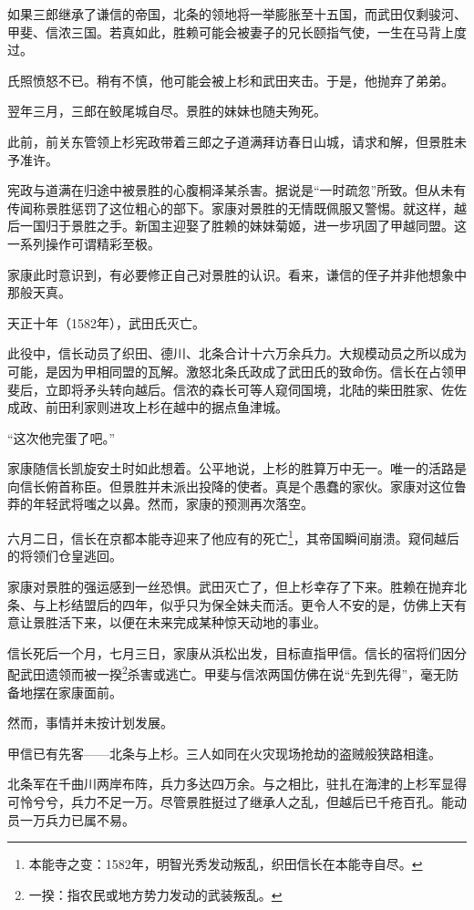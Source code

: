 \documentclass[
]{article}
\begin{document}
如果三郎继承了谦信的帝国，北条的领地将一举膨胀至十五国，而武田仅剩骏河、甲斐、信浓三国。若真如此，胜赖可能会被妻子的兄长颐指气使，一生在马背上度过。

氏照愤怒不已。稍有不慎，他可能会被上杉和武田夹击。于是，他抛弃了弟弟。

翌年三月，三郎在鲛尾城自尽。景胜的妹妹也随夫殉死。

此前，前关东管领上杉宪政带着三郎之子道满拜访春日山城，请求和解，但景胜未予准许。

宪政与道满在归途中被景胜的心腹桐泽某杀害。据说是``一时疏忽''所致。但从未有传闻称景胜惩罚了这位粗心的部下。家康对景胜的无情既佩服又警惕。就这样，越后一国归于景胜之手。新国主迎娶了胜赖的妹妹菊姬，进一步巩固了甲越同盟。这一系列操作可谓精彩至极。

家康此时意识到，有必要修正自己对景胜的认识。看来，谦信的侄子并非他想象中那般天真。

天正十年（1582年），武田氏灭亡。

此役中，信长动员了织田、德川、北条合计十六万余兵力。大规模动员之所以成为可能，是因为甲相同盟的瓦解。激怒北条氏政成了武田氏的致命伤。信长在占领甲斐后，立即将矛头转向越后。信浓的森长可等人窥伺国境，北陆的柴田胜家、佐佐成政、前田利家则进攻上杉在越中的据点鱼津城。

``这次他完蛋了吧。''

家康随信长凯旋安土时如此想着。公平地说，上杉的胜算万中无一。唯一的活路是向信长俯首称臣。但景胜并未派出投降的使者。真是个愚蠢的家伙。家康对这位鲁莽的年轻武将嗤之以鼻。然而，家康的预测再次落空。

六月二日，信长在京都本能寺迎来了他应有的死亡\footnote{本能寺之变：1582年，明智光秀发动叛乱，织田信长在本能寺自尽。}，其帝国瞬间崩溃。窥伺越后的将领们仓皇逃回。

家康对景胜的强运感到一丝恐惧。武田灭亡了，但上杉幸存了下来。胜赖在抛弃北条、与上杉结盟后的四年，似乎只为保全妹夫而活。更令人不安的是，仿佛上天有意让景胜活下来，以便在未来完成某种惊天动地的事业。

信长死后一个月，七月三日，家康从浜松出发，目标直指甲信。信长的宿将们因分配武田遗领而被一揆\footnote{一揆：指农民或地方势力发动的武装叛乱。}杀害或逃亡。甲斐与信浓两国仿佛在说``先到先得''，毫无防备地摆在家康面前。

然而，事情并未按计划发展。

甲信已有先客------北条与上杉。三人如同在火灾现场抢劫的盗贼般狭路相逢。

北条军在千曲川两岸布阵，兵力多达四万余。与之相比，驻扎在海津的上杉军显得可怜兮兮，兵力不足一万。尽管景胜挺过了继承人之乱，但越后已千疮百孔。能动员一万兵力已属不易。
\end{document}
